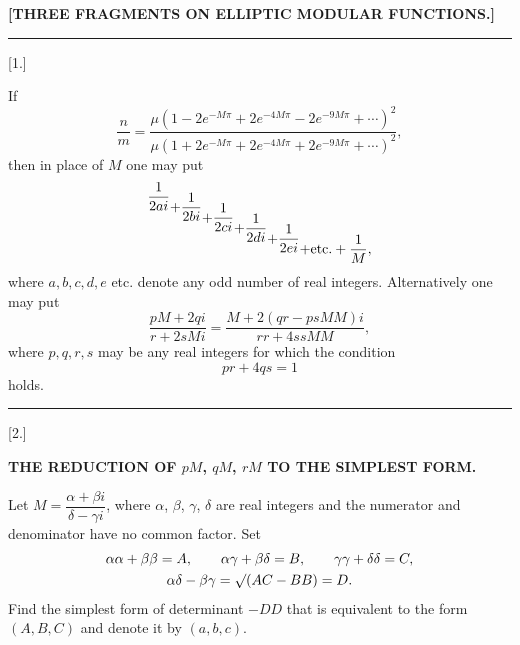 \begin{center}\textbf{[THREE FRAGMENTS ON ELLIPTIC MODULAR FUNCTIONS.]}\end{center}
\begin{center}\rule{1.5cm}{.4pt}\end{center}
\begin{center}[1.]\end{center}

If
\[
\frac{n}{m}=\frac{\mu(1-2e^{-M\pi}+2e^{-4M\pi}-2e^{-9M\pi}+\cdots)^2}{\mu(1+2e^{-M\pi}+2e^{-4M\pi}+2e^{-9M\pi}+\cdots)^2},
\]
then in place of $M$ one may put
\[
\frac{1}{2ai}\StepDown{.75}{+\frac{1}{2bi}}\StepDown{1.5}{+\frac{1}{2ci}}\StepDown{2.25}{+\frac{1}{2di}}\StepDown{3}{+\frac{1}{2ei}}\StepDown{3.75}{+\text{etc.}+\frac{1}{M},}
\]
where $a,b,c,d,e$ etc. denote any odd number of real integers. Alternatively one may put
\[
\frac{pM+2qi}{r+2sMi}=\frac{M+2(qr-psMM)i}{rr+4ssMM},
\]
where $p,q,r,s$ may be any real integers for which the condition
\[
pr+4qs=1
\]
holds.

\begin{center}\rule{3cm}{.4pt}\end{center}
\begin{center}[2.]\end{center}
\begin{center}\textbf{THE REDUCTION OF $pM$, $qM$, $rM$ TO THE SIMPLEST FORM.}\end{center}

Let $M=\dfrac{\alpha+\beta i}{\delta-\gamma i}$, where $\alpha$, $\beta$, $\gamma$, $\delta$ are real integers and the numerator and denominator have no common factor. Set
\[
\begin{gathered}
\alpha\alpha+\beta\beta=A,\qquad \alpha\gamma+\beta\delta=B,\qquad \gamma\gamma+\delta\delta=C,\\
\alpha\delta-\beta\gamma=\mathord{\surd}(AC-BB)=D.
\end{gathered}
\]
Find the simplest form of determinant $-DD$ that is equivalent to the form $(A,B,C)$ and denote it by $(a,b,c)$.

